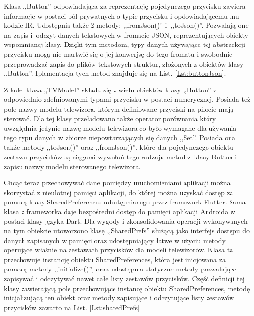 \documentclass[12pt,twoside]{article}
\begin{document}
Klasa ,,Button'' odpowiadająca za reprezentację  pojedynczego przycisku zawiera informacje w postaci pól prywatnych o typie przycisku i opdowiadającemu mu kodzie IR. Udostępnia także 2 metody: ,,fromJson()'' i~,,toJson()''. Pozwalają one na zapis i~odczyt danych tekstowych w fromacie JSON, reprezentujących obiekty wspomnianej klasy. Dzięki tym metodom, typy danych używające tej abstrackcji przycisku mogą nie martwić się o jej konwerjsę do tego fromatu i swobodnie przeprowadzać zapis do plików tekstowych struktur, złożonych z obiektów klasy ,,Button''. Iplementacja tych metod znajduje się na List. \ref*{Lst:buttonJson}.


Z kolei klasa ,,TVModel'' składa się z wielu obiektów klasy ,,Button'' z odpowiednio zdefniowanymi typami przycisku w postaci numerycznej. Posiada też pole nazwy modelu telewizora, którym definiowane przyciski na pilocie mają sterować. Dla tej klasy przeładowano także operator porównania który uwzględnia jedynie nazwę modelu telewizora co było wymagane dla używania tego typu danych w zbiorze niepowtarzających się danych ,,Set''. Posiada ona także metody ,,toJson()'' oraz ,,fromJson()'', które dla pojedynczego obiektu zestawu przycisków są ciągami wywołań tego rodzaju metod z~klasy Button i zapisu nazwy modelu sterowanego telewizora. 

Chcąc teraz przechowywać dane pomiędzy uruchomieniami aplikacji można skorzystać z nieulotnej pamięci aplikacji, do której można uzyskać dostęp za pomocą klasy SharedPreferences\cite{sharedPreferences} udostępnianego przez framework Flutter. Sama klasa z frameworka daje bezpośredni dostęp do pamięci aplikacji Androida w postaci klasy języka Dart. Dla wygody i zkonsolidowania operacji wykonywanych na tym obiekcie utoworzono klasę ,,SharedPrefs'' służącą jako interfejs dostępu do danych zapisanych w pamięci oraz udostępniający łatwe w użyciu metody operujące właśnie na zestawach przycisków dla modeli telewizorów. Klasa ta przechowuje instancję obiektu SharedPreferences, która jest inicjowana za pomocą metody ,,initialize()'', oraz udostępnia statyczne metody pozwalające zapisywać i odczytywać nawet całe listy zestawów przycisków. Część definicji tej klasy zawierającą pole przechowujące instancę obiektu SharedPreferences, metodę inicjalizującą ten obiekt oraz metody zapisujące i odczytujące listy zestawów przycisków zawarto na List. \ref*{Lst:sharedPrefs}
\end{document}
